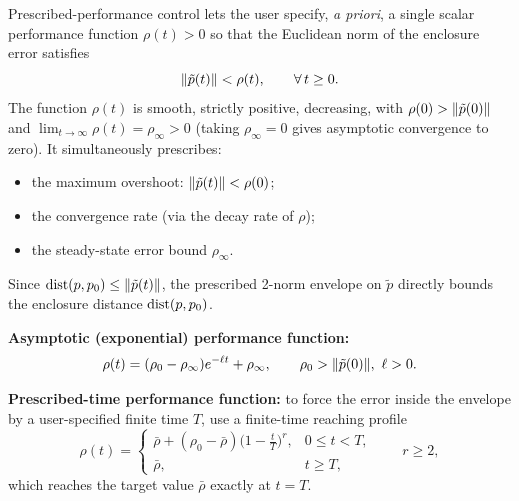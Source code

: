 Prescribed-performance control lets the user specify, \emph{a priori}, a
single scalar performance function $\rho(t)>0$ so that the Euclidean norm of
the enclosure error satisfies
\begin{equation}
    \lVert \tilde p(t) \rVert < \rho(t), \qquad \forall\, t\ge 0.
    \label{eq:ppc-constraint}
\end{equation}
The function $\rho(t)$ is smooth, strictly positive, decreasing,
with $\rho(0)>\lVert \tilde p(0) \rVert$ and
$\lim_{t\to\infty}\rho(t)=\rho_\infty>0$ (taking $\rho_\infty=0$ gives
asymptotic convergence to zero). It simultaneously prescribes:
\begin{itemize}
    \item the maximum overshoot: $\lVert \tilde p(t) \rVert<\rho(0)$;
    \item the convergence rate (via the decay rate of $\rho$);
    \item the steady-state error bound $\rho_\infty$.
\end{itemize}
Since $\mathrm{dist}(p,p_0)\le\lVert \tilde p(t) \rVert$, the prescribed 2-norm envelope on
$\tilde p$ directly bounds the enclosure distance $\mathrm{dist}(p,p_0)$.

\textbf{Asymptotic (exponential) performance function:}
\begin{equation}
    \rho(t)=(\rho_0-\rho_\infty)e^{-\ell t}+\rho_\infty,
    \qquad \rho_0>\lVert \tilde p(0) \rVert,\ \ell>0.
    \label{eq:rho-exp}
\end{equation}

\textbf{Prescribed-time performance function:} to force the error inside
the envelope by a user-specified finite time $T$, use a finite-time
reaching profile
\begin{equation}
    \rho(t)=
    \begin{cases}
    \bar\rho + (\rho_0-\bar\rho)\bigl(1-\tfrac{t}{T}\bigr)^r, & 0\le t<T,\\[4pt]
    \bar\rho, & t\ge T,
    \end{cases}
    \qquad r\ge 2,
    \label{eq:rho-pt}
\end{equation}
which reaches the target value $\bar\rho$ exactly at $t=T$.

